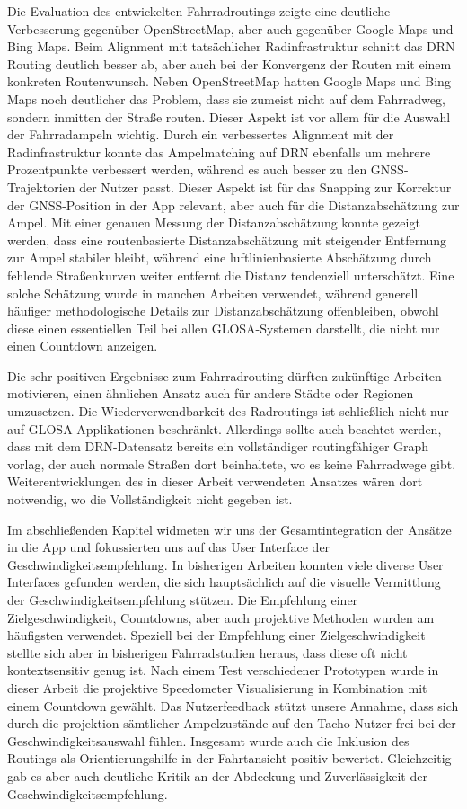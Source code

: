 Die Evaluation des entwickelten Fahrradroutings zeigte eine deutliche Verbesserung gegenüber OpenStreetMap, aber auch gegenüber Google Maps und Bing Maps. Beim Alignment mit tatsächlicher Radinfrastruktur schnitt das DRN Routing deutlich besser ab, aber auch bei der Konvergenz der Routen mit einem konkreten Routenwunsch. Neben OpenStreetMap hatten Google Maps und Bing Maps noch deutlicher das Problem, dass sie zumeist nicht auf dem Fahrradweg, sondern inmitten der Straße routen. Dieser Aspekt ist vor allem für die Auswahl der Fahrradampeln wichtig. Durch ein verbessertes Alignment mit der Radinfrastruktur konnte das Ampelmatching auf DRN ebenfalls um mehrere Prozentpunkte verbessert werden, während es auch besser zu den GNSS-Trajektorien der Nutzer passt. Dieser Aspekt ist für das Snapping zur Korrektur der GNSS-Position in der App relevant, aber auch für die Distanzabschätzung zur Ampel. Mit einer genauen Messung der Distanzabschätzung konnte gezeigt werden, dass eine routenbasierte Distanzabschätzung mit steigender Entfernung zur Ampel stabiler bleibt, während eine luftlinienbasierte Abschätzung durch fehlende Straßenkurven weiter entfernt die Distanz tendenziell unterschätzt. Eine solche Schätzung wurde in manchen Arbeiten verwendet, während generell häufiger methodologische Details zur Distanzabschätzung offenbleiben, obwohl diese einen essentiellen Teil bei allen GLOSA-Systemen darstellt, die nicht nur einen Countdown anzeigen.

Die sehr positiven Ergebnisse zum Fahrradrouting dürften zukünftige Arbeiten motivieren, einen ähnlichen Ansatz auch für andere Städte oder Regionen umzusetzen. Die Wiederverwendbarkeit des Radroutings ist schließlich nicht nur auf GLOSA-Applikationen beschränkt. Allerdings sollte auch beachtet werden, dass mit dem DRN-Datensatz bereits ein vollständiger routingfähiger Graph vorlag, der auch normale Straßen dort beinhaltete, wo es keine Fahrradwege gibt. Weiterentwicklungen des in dieser Arbeit verwendeten Ansatzes wären dort notwendig, wo die Vollständigkeit nicht gegeben ist. 

Im abschließenden Kapitel widmeten wir uns der Gesamtintegration der Ansätze in die App und fokussierten uns auf das User Interface der Geschwindigkeitsempfehlung. In bisherigen Arbeiten konnten viele diverse User Interfaces gefunden werden, die sich hauptsächlich auf die visuelle Vermittlung der Geschwindigkeitsempfehlung stützen. Die Empfehlung einer Zielgeschwindigkeit, Countdowns, aber auch projektive Methoden wurden am häufigsten verwendet. Speziell bei der Empfehlung einer Zielgeschwindigkeit stellte sich aber in bisherigen Fahrradstudien heraus, dass diese oft nicht kontextsensitiv genug ist. Nach einem Test verschiedener Prototypen wurde in dieser Arbeit die projektive Speedometer Visualisierung in Kombination mit einem Countdown gewählt. Das Nutzerfeedback stützt unsere Annahme, dass sich durch die projektion sämtlicher Ampelzustände auf den Tacho Nutzer frei bei der Geschwindigkeitsauswahl fühlen. Insgesamt wurde auch die Inklusion des Routings als Orientierungshilfe in der Fahrtansicht positiv bewertet. Gleichzeitig gab es aber auch deutliche Kritik an der Abdeckung und Zuverlässigkeit der Geschwindigkeitsempfehlung.

